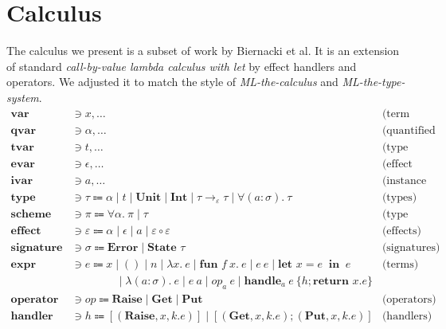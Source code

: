 \documentclass[declaration,shortabstract]{iithesis}
\newcommand{\arrow}[3]{{#1}\rightarrow_{#2}{#3}}
\newcommand{\lam}[1][x]{\ensuremath{\lambda #1.\:}}
\begin{document}
\chapter{Calculus}
The calculus we present is a subset of work by Biernacki et al\cite{binders-labels}.
It is an extension of standard \textit{call-by-value lambda calculus with let} by effect handlers and operators. 
We adjusted it to match the style of \textit{ML-the-calculus} and \textit{ML-the-type-system}\cite{emlti}. 
\begin{align*} 
\textbf{var} & \ni x , \dots & \text{(term variables)}
\\ 
\textbf{qvar} & \ni \alpha , \dots & \text{(quantified variables)}
\\ 
\textbf{tvar} & \ni t , \dots & \text{(type variables)}
\\ 
\textbf{evar} & \ni \epsilon , \dots & \text{(effect variables)}
\\ 
\textbf{ivar} & \ni a , \dots & \text{(instance variables)}
\\ 
\textbf{type} & \ni \tau \Coloneqq
\alpha \mid t \mid \textbf{Unit} \mid \textbf{Int} \mid \arrow{\tau}{\varepsilon}{\tau}
\mid \forall (a : \sigma) .\: \tau
 & \text{(types)}
\\
\textbf{scheme} & \ni \pi \Coloneqq \forall \alpha.\:\pi \mid \tau &\text{(type schemes)}
\\ 
\textbf{effect} & \ni \varepsilon \Coloneqq 
\alpha \mid \epsilon \mid a \mid \varepsilon \circ \varepsilon 
 & \text{(effects)}
\\ 
\textbf{signature} & \ni \sigma \Coloneqq \textbf{Error} \mid \textbf{State } \tau& \text{(signatures)}
\\
\textbf{expr} & \ni e \Coloneqq x \mid () \mid n \mid \lam e \mid \textbf{fun }f\:x.\:e \mid e \: e \mid \textbf{let } x = e \: \textbf{ in } \: e & \text{(terms)}
\\
 & \qquad\qquad \mid \lam[(a : \sigma)] e \mid e \: a \mid op_a \: e \mid \textbf{handle}_a \: e\: \{h; \textbf{return } x. e\}
\\
\textbf{operator} & \ni op \Coloneqq \textbf{Raise} \mid \textbf{Get} \mid \textbf{Put} & \text{(operators)} 
\\ 
\textbf{handler} & \ni h \Coloneqq [(\textbf{Raise}, x, k. e)] \mid [(\textbf{Get}, x, k. e); (\textbf{Put}, x, k. e)]& \text{(handlers)}
\end{align*}
\end{document}
